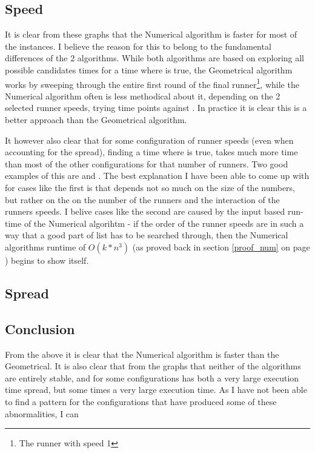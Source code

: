 \subsection{Speed}


It is clear from these graphs that the Numerical algorithm is faster for most of the instances. 
I believe the reason for this to belong to the fundamental differences of the 2 algorithms. While both algorithms are based on exploring all possible candidates times for a time where  is true, the Geometrical algorithm works by sweeping through the entire first round of the final runner\footnote{The runner with speed 1}, while the Numerical algorithm often is less methodical about it, depending on the 2 selected runner speeds, trying time points against . In practice it is clear this is a better approach than the Geometrical algorithm.
 
It however also clear that for some configuration of runner speeds (even when accounting for the spread), finding a time where  is true, takes much more time than most of the other configurations for that number of runners. Two good examples of this are  and . The best explanation I have been able to come up with for cases like the first is that  depends not so much on the size of the numbers, but rather on the on the number of the runners and the interaction of the runners speeds. I belive cases like the second are caused by the input based run-time of the Numerical algorihtm - if the order of the runner speeds are in such a way that a good part of list has to be searched through, then the Numerical algorithms runtime of $O(k * n^3)$ (as proved back in section \ref{proof_num} on page \pageref{proof_num}) begins to show itself.  

\subsection{Spread}




\subsection{Conclusion}

From the above it is clear that the Numerical algorithm is faster than the Geometrical. It is also clear that from the graphs that neither of the algorithms are entirely stable, and for some configurations has both a very large execution time spread, but some times a very large execution time. As I have not been able to find a pattern for the configurations that have produced some of these abnormalities, I can 
